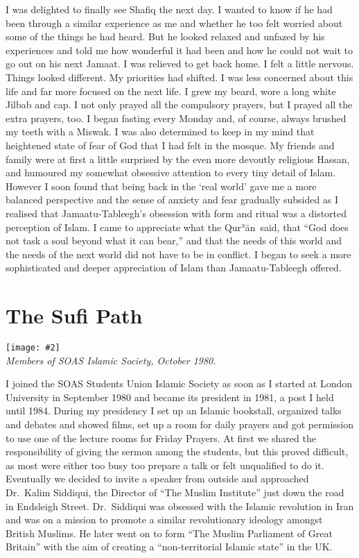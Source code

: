 \documentclass[12pt]{memoir}
\def\´{ʾ} %
\newcommand{\cor}[2]{#2} %
\def \Quran{Qur\-\´ān} %
\def\–{-\hskip0pt}
\newcommand{\img}[3]{\begin{center}%
\texttt{[image: \#2]}\\{\small\em#3}%
\end{center}}
\begin{document}
I was delighted to finally see Shafiq the next day.
I wanted to know if he had been through a similar experience as me
and whether he too felt worried about some of the things he had heard.
But he looked relaxed and \cor{un-phased}{unfazed} by his experiences
and told me how wonderful it had been
and how he could not wait to go out on his next Jamaat.
I was relieved to get back home.
I felt a little nervous.
Things looked different.
My priorities had shifted.
I was less concerned about this life and far more focused on the next life.
I grew my beard, wore a long white Jilbab and cap.
I not only prayed all the compulsory prayers,
but I prayed all the extra prayers, too.
I began fasting every Monday and, of course,
always brushed my teeth with a Miswak.
I was also determined to keep in my mind
that heightened state of fear of God that I had felt in the mosque.
My friends and family were at first a little surprised
by the even more devoutly religious Hassan,
and humoured my somewhat obsessive attention to every tiny detail of Islam.
However I soon found that being back in the ‘real world’
gave me a more balanced perspective
and the sense of anxiety and fear gradually subsided
as I realised that Jamaatu\cor{ }{\–}Tableegh’s obsession
with form and ritual was a distorted perception of Islam.
I came to appreciate what the \Quran\ said, that
“God does not task a soul beyond what it can bear,”
and that the needs of this world
and the needs of the next world did not have to be in conflict.
I began to seek a more sophisticated and deeper appreciation of Islam than
Jamaatu\–Tableegh offered.


\chapter{The Sufi Path}

\img{scale=0.7}{Members_SOAS_Islamic_Society.jpg}
{Members of SOAS Islamic Society, October 1980.}

I joined the SOAS Students Union Islamic Society as soon as I started
at London University in September 1980
and became it\cor{’}{}s president in 1981,
a post I held until 1984.
During my presidency I set up an Islamic bookstall,
organized talks and debates and showed films,
set up a room for daily prayers and got permission
to use one of the lecture rooms for Friday Prayers.
At first we shared the responsibility of giving the sermon among the students,
but this proved difficult,
as most were either too busy too prepare a talk or felt unqualified to do it.
Eventually we decided to invite a speaker from outside
and approached Dr.\ Kalim Siddiqui,
the Director of “The Muslim Institute” just down the road in Endsleigh Street.
Dr.\ Siddiqui was obsessed with the Islamic revolution in Iran
and was on a mission to promote a similar revolutionary ideology
amongst British Muslims.
He later went on to form “The Muslim Parliament of Great Britain”
with the aim of creating a “non-territorial Islamic state” in the UK.
\end{document}
